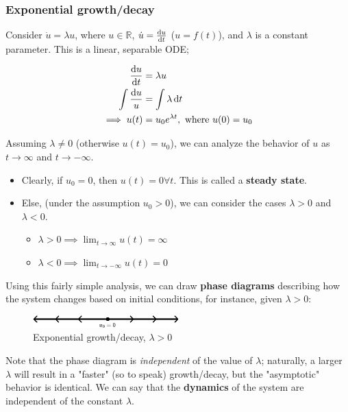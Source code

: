 \documentclass[12pt]{article}
\begin{document}
\subsubsection{Exponential growth/decay}

Consider $\dot{u} = \lambda u$, where $u \in \mathbb{R}$, $\dot{u} = \dv{u}{t}$ ($u = f(t)$), and $\lambda$ is a constant parameter. This is a linear, separable ODE;

\begin{align*}
  \dv{u}{t} &= \lambda u\\
  \int \frac{\dd{u}}{u} &= \int \lambda \dd{t}\\
  \implies u(t) &= u_0 e^{\lambda t}, \text{ where } u(0) = u_0
\end{align*}

Assuming $\lambda \neq 0$ (otherwise $u(t) = u_0$), we can analyze the behavior of $u$ as $t \longrightarrow \infty$ and $t \longrightarrow -\infty$.

\begin{itemize}
  \item Clearly, if $u_0 = 0$, then $u(t) = 0 \forall t$. This is called a \textbf{steady state}.
  \item Else, (under the assumption $u_0 > 0$), we can consider the cases $\lambda > 0$ and $\lambda < 0$.
  \begin{itemize}
    \item $\lambda >0 \implies \lim_{t \to \infty} u(t) = \infty$
    \item $\lambda < 0 \implies \lim_{t \to -\infty} u(t) = 0$
  \end{itemize}
\end{itemize}

Using this fairly simple analysis, we can draw \textbf{phase diagrams} describing how the system changes based on initial conditions, for instance, given $\lambda > 0$:
\begin{figure}[h!]
  \centering
  \includegraphics*[width=0.5\textwidth]{figures/example1-1-1.png}
  \caption{Exponential growth/decay, $\lambda> 0$}
\end{figure}

Note that the phase diagram is \emph{independent} of the value of $\lambda$; naturally, a larger $\lambda$ will result in a "faster" (so to speak) growth/decay, but the "asymptotic" behavior is identical. We can say that the \textbf{dynamics} of the system are independent of the constant $\lambda$.
\end{document}
